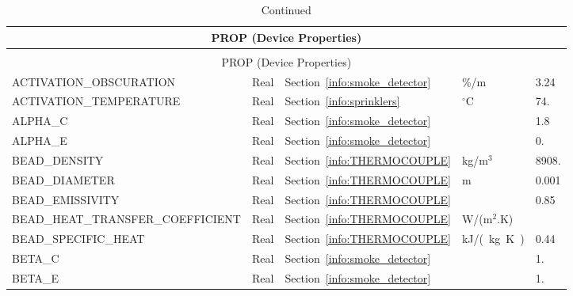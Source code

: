 \documentclass[11pt]{book}
\begin{document}
\begin{longtable}{@{\extracolsep{\fill}}|l|l|l|l|l|}
\caption[Device properties ({\ct PROP} namelist group)]{For more information see Section~\ref{info:PROP}.}
\label{tbl:PROP} \\
\hline
\multicolumn{5}{|c|}{{\ct PROP} (Device Properties)} \\
\hline \hline
\endfirsthead
\caption[]{Continued} \\
\hline
\multicolumn{5}{|c|}{{\ct PROP} (Device Properties)} \\
\hline \hline
\endhead
{\ct ACTIVATION\_OBSCURATION}           & Real          & Section~\ref{info:smoke_detector}         & \%/m                  & 3.24      \\ \hline
{\ct ACTIVATION\_TEMPERATURE}           & Real          & Section~\ref{info:sprinklers}             & $^\circ$C             & 74.        \\ \hline
{\ct ALPHA\_C}                          & Real          & Section~\ref{info:smoke_detector}         &                       & 1.8       \\ \hline
{\ct ALPHA\_E}                          & Real          & Section~\ref{info:smoke_detector}         &                       & 0.       \\ \hline
{\ct BEAD\_DENSITY}                     & Real          & Section~\ref{info:THERMOCOUPLE}           & kg/m$^3$              & 8908.     \\ \hline
{\ct BEAD\_DIAMETER}                    & Real          & Section~\ref{info:THERMOCOUPLE}           & m                     & 0.001     \\ \hline
{\ct BEAD\_EMISSIVITY}                  & Real          & Section~\ref{info:THERMOCOUPLE}           &                       & 0.85      \\ \hline
{\ct BEAD\_HEAT\_TRANSFER\_COEFFICIENT} & Real          & Section~\ref{info:THERMOCOUPLE}           & \si{W/(m$^2$.K)}      &           \\ \hline
{\ct BEAD\_SPECIFIC\_HEAT}              & Real          & Section~\ref{info:THERMOCOUPLE}           & \si{kJ/(kg.K)}        & 0.44      \\ \hline
{\ct BETA\_C}                           & Real          & Section~\ref{info:smoke_detector}         &                       & 1.       \\ \hline
{\ct BETA\_E}                           & Real          & Section~\ref{info:smoke_detector}         &                       & 1.       \\ \hline

\end{longtable}
\end{document}
